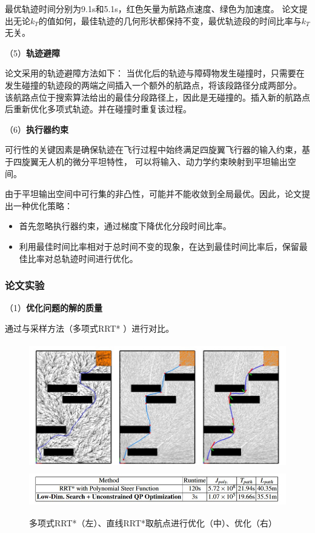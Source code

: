 最优轨迹时间分别为9.1s和5.1s，红色矢量为航路点速度、绿色为加速度。
论文提出无论$k_T$的值如何，最佳轨迹的几何形状都保持不变，最优轨迹段的时间比率与$k_T$无关。


（5）\textbf{轨迹避障}


论文采用的轨迹避障方法如下：
当优化后的轨迹与障碍物发生碰撞时，只需要在发生碰撞的轨迹段的两端之间插入一个额外的航路点，将该段路径分成两部分。
该航路点位于搜索算法给出的最佳分段路径上，因此是无碰撞的。插入新的航路点后重新优化多项式轨迹。并在碰撞时重复该过程。


（6）\textbf{执行器约束}


可行性的关键因素是确保轨迹在飞行过程中始终满足四旋翼飞行器的输入约束，基于四旋翼无人机的微分平坦特性，
可以将输入、动力学约束映射到平坦输出空间。

由于平坦输出空间中可行集的非凸性，可能并不能收敛到全局最优。因此，论文提出一种优化策略：
\begin{itemize}
    \item 首先忽略执行器约束，通过梯度下降优化分段时间比率。
    \item 利用最佳时间比率相对于总时间不变的现象，在达到最佳时间比率后，保留最佳比率对总轨迹时间进行优化。
\end{itemize}

\subsubsection{论文实验}
（1）\textbf{优化问题的解的质量}


    通过与采样方法（多项式RRT* ）进行对比。
    \begin{figure}[htbp]
        \centering
        \includegraphics[width=12cm, height=5.5cm]{image/poly3.jpg}
        \includegraphics[width=12cm, height=1.5cm]{image/poly.jpg}
        \caption{多项式RRT*（左）、直线RRT*取航点进行优化（中）、优化（右）}\label{poly3}
    \end{figure}


